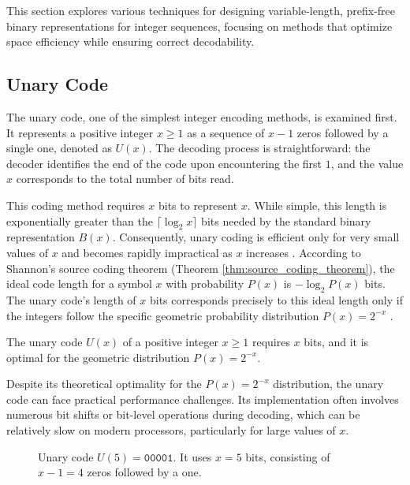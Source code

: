 \noindent This section explores various techniques for designing variable-length, prefix-free binary representations for integer sequences, focusing on methods that optimize space efficiency while ensuring correct decodability.

\subsection{Unary Code}
The unary code, one of the simplest integer encoding methods, is examined first. It represents a positive integer $x \geq 1$ as a sequence of $x-1$ zeros followed by a single one, denoted as $U(x)$. The decoding process is straightforward: the decoder identifies the end of the code upon encountering the first $1$, and the value $x$ corresponds to the total number of bits read.

\noindent This coding method requires $x$ bits to represent $x$. While simple, this length is exponentially greater than the $\lceil\log_2 x \rceil$ bits needed by the standard binary representation $B(x)$. Consequently, unary coding is efficient only for very small values of $x$ and becomes rapidly impractical as $x$ increases \cite{witten1999managing}. According to Shannon's source coding theorem (Theorem \ref{thm:source_coding_theorem}), the ideal code length for a symbol $x$ with probability $P(x)$ is $-\log_2 P(x)$ bits. The unary code's length of $x$ bits corresponds precisely to this ideal length only if the integers follow the specific geometric probability distribution $P(x) = 2^{-x}$ \cite{witten1999managing, sayood2002lossless}.

\begin{theorem}
    The unary code $U(x)$ of a positive integer $x \ge 1$ requires $x$ bits, and it is optimal for the geometric distribution $P(x)=2^{-x}$.
\end{theorem}

\noindent Despite its theoretical optimality for the $P(x)=2^{-x}$ distribution, the unary code can face practical performance challenges. Its implementation often involves numerous bit shifts or bit-level operations during decoding, which can be relatively slow on modern processors, particularly for large values of $x$.

\begin{figure}[hbtp]
    \centering
    \caption{Unary code $U(5) = \texttt{00001}$. It uses $x=5$ bits, consisting of $x-1=4$ zeros followed by a one.}
    \label{fig:unary_code_example}
\end{figure}

